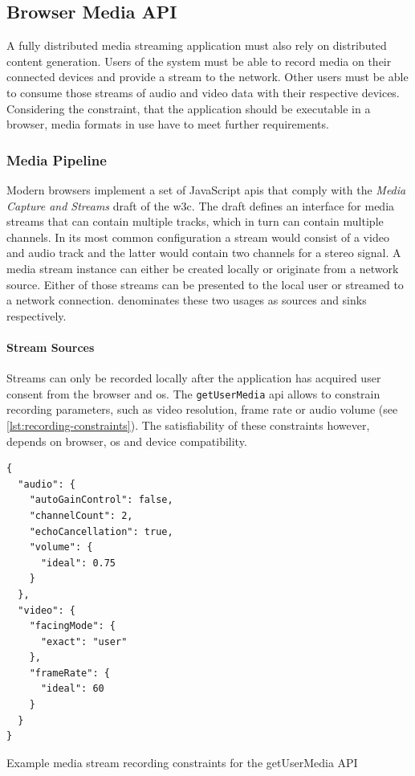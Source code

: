 \subsection{Browser Media API}

A fully distributed media streaming application must also rely on distributed content generation. Users of the system must be able to record media on their connected devices and provide a stream to the network. Other users must be able to consume those streams of audio and video data with their respective devices. Considering the constraint, that the application should be executable in a browser, media formats in use have to meet further requirements.

\subsubsection{Media Pipeline}
\label{browser-api}

Modern browsers implement a set of JavaScript \glspl{api} that comply with the {\textit{Media Capture and Streams}} draft \citep{media-capture-and-streams} of the \gls{w3c}. The draft defines an interface for media streams that can contain multiple tracks, which in turn can contain multiple channels. In its most common configuration a stream would consist of a video and audio track and the latter would contain two channels for a stereo signal. A media stream instance can either be created locally or originate from a network source. Either of those streams can be presented to the local user or streamed to a network connection. \citet{media-capture-and-streams} denominates these two usages as sources and sinks respectively.

\paragraph{Stream Sources}
Streams can only be recorded locally after the application has acquired user consent from the browser and \gls{os}. The \lstinline|getUserMedia| \gls{api} \cite{get-user-media} allows to constrain recording parameters, such as video resolution, frame rate or audio volume (see \ref{lst:recording-constraints}). The satisfiability of these constraints however, depends on browser, \gls{os} and device compatibility.

\begin{Listing}
\begin{lstlisting}
{
  "audio": {
    "autoGainControl": false,
    "channelCount": 2,
    "echoCancellation": true,
    "volume": {
      "ideal": 0.75
    }
  },
  "video": {
    "facingMode": {
      "exact": "user"
    },
    "frameRate": {
      "ideal": 60
    }
  }
}
\end{lstlisting}
\caption{Example media stream recording constraints for the getUserMedia API}
\label{lst:recording-constraints}
\end{Listing}


